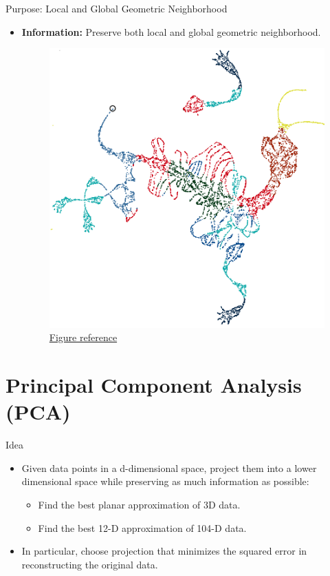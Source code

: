 \documentclass[serif, aspectratio=169]{beamer}
\begin{document}
\begin{frame}{Purpose: Local and Global Geometric Neighborhood}
    \begin{itemize}
        \item \textbf{Information:} Preserve both local and global geometric neighborhood.
        \begin{figure}[htpb]
                \begin{center}
                    \includegraphics[keepaspectratio, scale=0.45]{pic/global_relation.PNG}
                  \caption{\href{https://pair-code.github.io/understanding-umap/}{Figure reference}}
                \end{center}
        \end{figure}
    \end{itemize}
\end{frame}

\section{Principal Component Analysis (PCA)}

\begin{frame}{Idea}
    \begin{itemize}
        \item Given data points in a d-dimensional space, project them into a lower dimensional space while preserving as much information as possible:
        \begin{itemize}
            \item Find the best planar approximation of 3D data.
            \item Find the best 12-D approximation of 104-D data.
        \end{itemize}
        \item In particular, choose projection that minimizes the squared error in reconstructing the original data.
    \end{itemize}
\end{frame}
\end{document}
